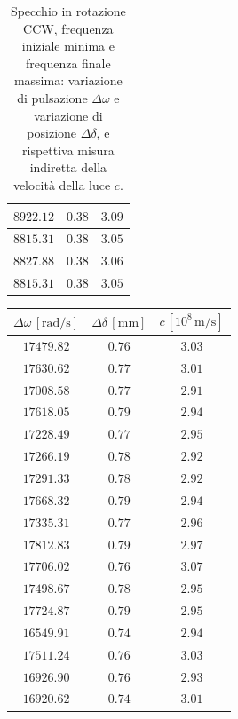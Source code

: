 \documentclass[]{article}
\begin{document}
\begin{table}
\begin{tabular}{||c|c|c||}
            $8922.12$ & $0.38$ & $3.09$ \\\hline
            $8815.31$ & $0.38$ & $3.05$ \\\hline
            $8827.88$ & $0.38$ & $3.06$ \\\hline
            $8815.31$ & $0.38$ & $3.05$ \\\hline
        \end{tabular}
        \caption{Specchio in rotazione CCW, frequenza iniziale minima e frequenza finale massima: variazione di pulsazione $\Delta\omega$ e variazione di posizione $\Delta\delta$, e rispettiva misura indiretta della velocità della luce $c$.}
        \label{CCW_min_max-c}
    \end{table}

    \begin{table}
        \centering
        \begin{tabular}{||c|c|c||}
            \hline
            $\Delta \omega \,[\text{rad/s}]$ & $\Delta \delta \,[\text{mm}]$ & $c \,[10^8 \,\text{m/s}]$ \\
            \hline\hline
            $17479.82$ & $0.76$ & $3.03$ \\\hline
            $17630.62$ & $0.77$ & $3.01$ \\\hline
            $17008.58$ & $0.77$ & $2.91$ \\\hline
            $17618.05$ & $0.79$ & $2.94$ \\\hline
            $17228.49$ & $0.77$ & $2.95$ \\\hline
            $17266.19$ & $0.78$ & $2.92$ \\\hline
            $17291.33$ & $0.78$ & $2.92$ \\\hline
            $17668.32$ & $0.79$ & $2.94$ \\\hline
            $17335.31$ & $0.77$ & $2.96$ \\\hline
            $17812.83$ & $0.79$ & $2.97$ \\\hline
            $17706.02$ & $0.76$ & $3.07$ \\\hline
            $17498.67$ & $0.78$ & $2.95$ \\\hline
            $17724.87$ & $0.79$ & $2.95$ \\\hline
            $16549.91$ & $0.74$ & $2.94$ \\\hline
            $17511.24$ & $0.76$ & $3.03$ \\\hline
            $16926.90$ & $0.76$ & $2.93$ \\\hline
            $16920.62$ & $0.74$ & $3.01$ \\\hline

\end{tabular}
\end{table}
\end{document}

